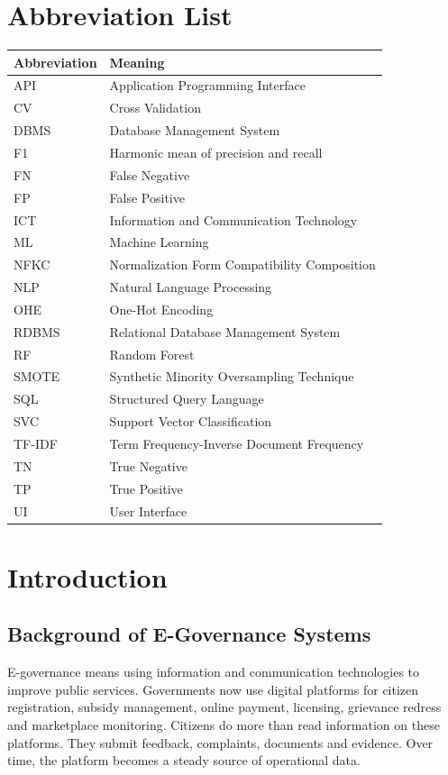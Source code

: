 \documentclass[12pt,a4paper,openany]{book}
\begin{document}
\chapter*{Abbreviation List}
\begin{longtable}{p{}p{}}
\toprule
\textbf{Abbreviation} & \textbf{Meaning}\\
\midrule
API & Application Programming Interface\\
CV & Cross Validation\\
DBMS & Database Management System\\
F1 & Harmonic mean of precision and recall\\
FN & False Negative\\
FP & False Positive\\
ICT & Information and Communication Technology\\
ML & Machine Learning\\
NFKC & Normalization Form Compatibility Composition\\
NLP & Natural Language Processing\\
OHE & One-Hot Encoding\\
RDBMS & Relational Database Management System\\
RF & Random Forest\\
SMOTE & Synthetic Minority Oversampling Technique\\
SQL & Structured Query Language\\
SVC & Support Vector Classification\\
TF-IDF & Term Frequency-Inverse Document Frequency\\
TN & True Negative\\
TP & True Positive\\
UI & User Interface\\
\bottomrule
\end{longtable}

\mainmatter

\chapter{Introduction}

\section{Background of E-Governance Systems}
E-governance means using information and communication technologies to improve public services. Governments now use digital platforms for citizen registration, subsidy management, online payment, licensing, grievance redress and marketplace monitoring. Citizens do more than read information on these platforms. They submit feedback, complaints, documents and evidence. Over time, the platform becomes a steady source of operational data.
\end{document}
